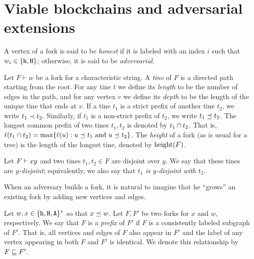 \section{Viable blockchains and adversarial extensions}
  A vertex of a fork is said to be \emph{honest} 
  if it is labeled with an index $i$ such that $w_i \in \{\mathtt{h}, \mathtt{H}\}$; 
  otherwise, it is said to be \emph{adversarial}.

  \begin{definition}
    Let $F \vdash w$ be a fork for a characteristic string.  A
    \emph{tine} of $F$ is a directed path starting from the root. For
    any tine $t$ we define its \emph{length} to be the number of edges
    in the path, and for any vertex $v$ we define its \emph{depth} to be
    the length of the unique tine that ends at $v$. 
    If a tine $t_1$ is a strict prefix of another tine $t_2$, we write $t_1 \prec t_2$. 
    Similarly, if $t_1$ is a non-strict prefix of $t_2$, we write $t_1 \preceq t_2$.
    The longest common prefix of two tines $t_1, t_2$ is denoted by $t_1 \cap t_2$. 
    That is, $\ell(t_1 \cap t_2) = \max\{\ell(u) : \text{$u \preceq t_1$ and $u \preceq t_2$} \}$. 
    The \emph{height} of
    a fork (as is usual for a tree) 
    is the length of the longest tine,
    denoted by $\operatorname{height}(F)$. 
  \end{definition}
  Let $F \vdash xy$ and 
  two tines $t_1, t_2 \in F$ are disjoint over $y$. 
  We say that these tines are \emph{$y$-disjoint}; 
  equivalently, we also say that \emph{$t_1$ is $y$-disjoint with $t_2$}.

  When an adversary builds a fork, it is natural to imagine that 
  he ``grows'' an existing fork by adding new vertices and edges. 
  \begin{definition}
    Let $w, x \in \{\mathtt{h}, \mathtt{H}, \mathtt{A}\}^*$ so that $x\preceq w$. 
    Let $F, F'$ be two forks for $x$ and $w$, respectively. 
    We say that $F$ is a \emph{prefix} of $F'$ if 
    $F$ is a consistently labeled subgraph of $F'$. 
    That is, all vertices and edges of $F$ also appear in $F'$ and 
    the label of any vertex appearing in both $F$ and $F'$ is identical. 
    We denote this relationship by $F\sqsubseteq F'$.
  \end{definition}

